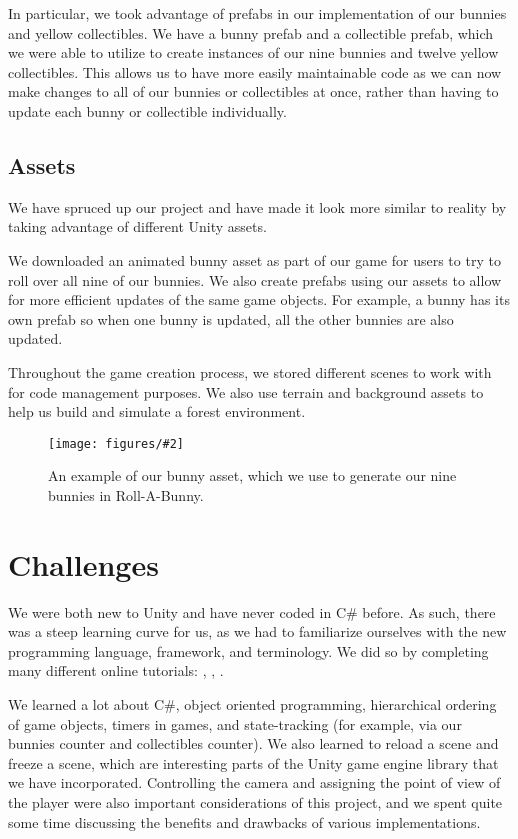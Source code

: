 \documentclass[12pt]{article}
\newcommand{\sfig}[3]{\begin{figure}[!ht]
\begin{center}
\texttt{[image: figures/\#2]}
\caption{#3}
\label{#2}
\end{center}
\end{figure}}
\begin{document}
  In particular, we took advantage of prefabs in our implementation of our bunnies and yellow collectibles. We have a bunny prefab and a collectible prefab, which we were able to utilize to create instances of our nine bunnies and twelve yellow collectibles. This allows us to have more easily maintainable code as we can now make changes to all of our bunnies or collectibles at once, rather than having to update each bunny or collectible individually.


\subsection{Assets}
  We have spruced up our project and have made it look more similar to reality by taking advantage of different Unity assets.
  
  We downloaded an animated bunny asset as part of our game for users to try to roll over all nine of our bunnies. We also create prefabs using our assets to allow for more efficient updates of the same game objects. For example, a bunny has its own prefab so when one bunny is updated, all the other bunnies are also updated. 
 
  Throughout the game creation process, we stored different scenes to work with for code management purposes. We also use terrain and background assets to help us build and simulate a forest environment. 

  \sfig{2in}{bunny-asset}{An example of our bunny asset, which we use to generate our nine bunnies in Roll-A-Bunny.}



\section{Challenges}
We were both new to Unity and have never coded in C\# before. As such, there was a steep learning curve for us, as we had to familiarize ourselves with the new programming language, framework, and terminology. We did so by completing many different online tutorials: \cite{tutorial-rab}, \cite{tutorial1}, \cite{tutorial-wam}.

We learned a lot about C\#, object oriented programming, hierarchical ordering of game objects, timers in games, and state-tracking (for example, via our bunnies counter and collectibles counter). We also learned to reload a scene and freeze a scene, which are interesting parts of the Unity game engine library that we have incorporated. Controlling the camera and assigning the point of view of the player were also important considerations of this project, and we spent quite some time discussing the benefits and drawbacks of various implementations.
\end{document}
